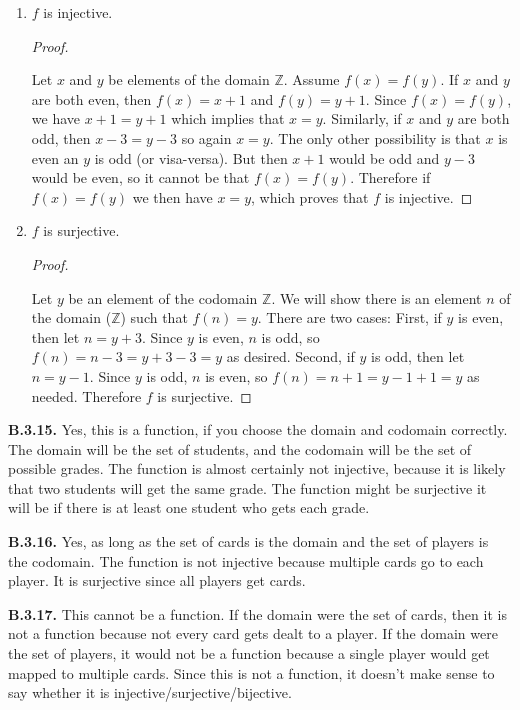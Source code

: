 \documentclass[10pt,]{book}
\theoremstyle{plain}
\theoremstyle{definition}
\theoremstyle{definition}
\theoremstyle{definition}
\theoremstyle{definition}
\numberwithin{equation}{chapter}
\def\Z{\mathbb Z}
\begin{document}
\begin{enumerate}[label=(\alph*)]
\item\hypertarget{li-639}{}\hypertarget{p-1772}{}%
\(f\) is injective.%
\begin{proof}\hypertarget{proof-18}{}
\hypertarget{p-1773}{}%
Let \(x\) and \(y\) be elements of the domain \(\Z\). Assume \(f(x) = f(y)\). If \(x\) and \(y\) are both even, then \(f(x) = x+1\) and \(f(y) = y+1\). Since \(f(x) = f(y)\), we have \(x + 1 = y + 1\) which implies that \(x = y\). Similarly, if \(x\) and \(y\) are both odd, then \(x - 3 = y-3\) so again \(x = y\). The only other possibility is that \(x\) is even an \(y\) is odd (or visa-versa). But then \(x + 1\) would be odd and \(y - 3\) would be even, so it cannot be that \(f(x) = f(y)\). Therefore if \(f(x) = f(y)\) we then have \(x = y\), which proves that \(f\) is injective.%
\end{proof}
\item\hypertarget{li-640}{}\hypertarget{p-1774}{}%
\(f\) is surjective.%
\begin{proof}\hypertarget{proof-19}{}
\hypertarget{p-1775}{}%
Let \(y\) be an element of the codomain \(\Z\). We will show there is an element \(n\) of the domain (\(\Z\)) such that \(f(n) = y\). There are two cases: First, if \(y\) is even, then let \(n = y+3\). Since \(y\) is even, \(n\) is odd, so \(f(n) = n-3 = y+3-3 = y\) as desired. Second, if \(y\) is odd, then let \(n = y-1\). Since \(y\) is odd, \(n\) is even, so \(f(n) = n+1 = y-1+1 = y\) as needed. Therefore \(f\) is surjective.%
\end{proof}
\end{enumerate}
%
\par\smallskip
\noindent\textbf{B.3.15.} \hypertarget{p-1777}{}%
Yes, this is a function, if you choose the domain and codomain correctly. The domain will be the set of students, and the codomain will be the set of possible grades. The function is almost certainly not injective, because it is likely that two students will get the same grade. The function might be surjective \textendash{} it will be if there is at least one student who gets each grade.%
\par\smallskip
\noindent\textbf{B.3.16.} \hypertarget{p-1779}{}%
Yes, as long as the set of cards is the domain and the set of players is the codomain. The function is not injective because multiple cards go to each player. It is surjective since all players get cards.%
\par\smallskip
\noindent\textbf{B.3.17.} \hypertarget{p-1781}{}%
This cannot be a function. If the domain were the set of cards, then it is not a function because not every card gets dealt to a player. If the domain were the set of players, it would not be a function because a single player would get mapped to multiple cards. Since this is not a function, it doesn't make sense to say whether it is injective/surjective/bijective.%
\par\smallskip
\end{document}
